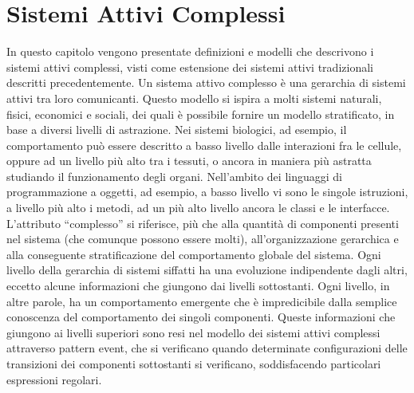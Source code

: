 \chapter{Sistemi Attivi Complessi}
In questo capitolo vengono presentate definizioni e modelli che descrivono i sistemi attivi complessi, visti come estensione dei sistemi attivi tradizionali descritti precedentemente. Un sistema attivo complesso è una gerarchia di sistemi attivi tra loro comunicanti. Questo modello si ispira a molti sistemi naturali, fisici, economici e sociali, dei quali è possibile fornire un modello stratificato, in base a diversi livelli di astrazione. Nei sistemi biologici, ad esempio, il comportamento può essere descritto a basso livello dalle interazioni fra le cellule, oppure ad un livello più alto tra i tessuti, o ancora in maniera più astratta studiando il funzionamento degli organi. Nell'ambito dei linguaggi di programmazione a oggetti, ad esempio, a basso livello vi sono le singole istruzioni, a livello più alto i metodi, ad un più alto livello ancora le classi e le interfacce. 
L'attributo ``complesso'' si riferisce, più che alla quantità di componenti presenti nel sistema (che comunque possono essere molti), all'organizzazione gerarchica e alla conseguente stratificazione del comportamento globale del sistema.
Ogni livello della gerarchia di sistemi siffatti ha una evoluzione indipendente dagli altri, eccetto alcune informazioni che giungono dai livelli sottostanti. Ogni livello, in altre parole, ha un comportamento emergente che è impredicibile dalla semplice conoscenza del comportamento dei singoli componenti. Queste informazioni che giungono ai livelli superiori sono resi nel modello dei sistemi attivi complessi attraverso pattern event, che si verificano quando determinate configurazioni delle transizioni dei componenti sottostanti si verificano, soddisfacendo particolari espressioni regolari.

